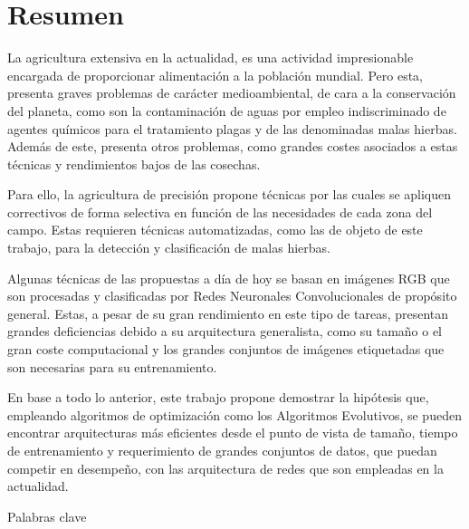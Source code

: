 %
\chapter*{Resumen}
\label{sec:abstract}
\vspace*{-10mm}

La agricultura extensiva en la actualidad, es una actividad impresionable encargada de proporcionar alimentación a la población mundial. Pero esta, presenta graves problemas de carácter medioambiental, de cara a la conservación del planeta, como son la contaminación de aguas por empleo indiscriminado de agentes químicos para el tratamiento plagas y de las denominadas malas hierbas. Además de este, presenta otros problemas, como grandes costes asociados a estas técnicas y rendimientos bajos de las cosechas.

Para ello, la agricultura de precisión propone técnicas por las cuales se apliquen correctivos de forma selectiva en función de las necesidades de cada zona del campo. Estas requieren técnicas automatizadas, como las de objeto de este trabajo, para la detección y clasificación de malas hierbas.

Algunas técnicas de las propuestas a día de hoy se basan en imágenes RGB que son procesadas y clasificadas por Redes Neuronales Convolucionales de propósito general. Estas, a pesar de su gran rendimiento en este tipo de tareas, presentan grandes deficiencias debido a su arquitectura generalista, como su tamaño o el gran coste computacional y los grandes conjuntos de imágenes etiquetadas que son necesarias para su entrenamiento.

En base a todo lo anterior, este trabajo propone demostrar la hipótesis que, empleando algoritmos de optimización como los Algoritmos Evolutivos, se pueden encontrar arquitecturas más eficientes desde el punto de vista de tamaño, tiempo de entrenamiento y requerimiento de grandes conjuntos de datos, que puedan competir en desempeño, con las arquitectura de redes que son empleadas en la actualidad.

\newpage

\vspace*{10mm}

{Palabras clave}\label{sec:palabras-clave} \\ 


